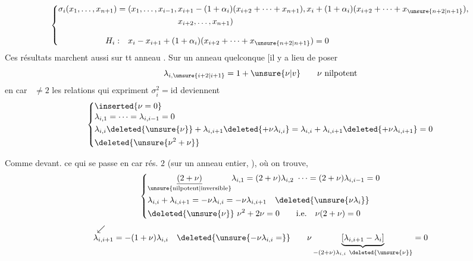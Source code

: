 \deleted{$\unsure{\sigma}$}
\[
\left\{\begin{aligned}
\sigma_i(x_1,\ldots,x_{n+1})={}&(x_1,\ldots,x_{i-1},x_{i+1}-(1+\alpha_i)(x_{i+2}+\cdots+x_{n+1}),x_i+(1+\alpha_i)(x_{i+2}+\cdots+x_{\unsure{n+2|n+1}}),\\
&\hspace{6em}x_{i+2},\ldots,x_{n+1})\\[2ex]
H_i:\quad &x_i-x_{i+1}+(1+\alpha_i)(x_{i+2}+\cdots+x_{\unsure{n+2|n+1}})=0
\end{aligned}\right.
\]
Ces résultats marchent aussi sur tt anneau . Sur un anneau quelconque [il y a lieu de  poser
\[
\lambda_{i,\unsure{i+2|i+1}}=1+\unsure{\nu|v}\qquad \nu\ \text{nilpotent}
\]
 en car \ $\ne2$ les relations qui expriment $\sigma_i^2=\mathrm{id}$ deviennent \unsure{$\nu$}
\[
\left\{\begin{aligned}
&\inserted{\nu=0}\\[-.5ex]
&\lambda_{i,1}=\cdots=\lambda_{i,i-1}=0\\
&\lambda_{i,i}\deleted{\unsure{\nu}}+\lambda_{i,i+1}\deleted{+\nu\lambda_{i,i}}=\lambda_{i,i}+\lambda_{i,i+1}\deleted{+\nu\lambda_{i,i+1}}=0\\
&\deleted{\unsure{\nu^2+\nu}}
\end{aligned}\right.
\]

Comme devant.  ce qui se passe en car rés. $2$ (sur un anneau entier, ), où on trouve, 
\[
\left\{\begin{aligned}
&\underset{\text{\unsure{nilpotent|inversible}}}{\underline{(2+\nu)}}\lambda_{i,1}=(2+\nu)\lambda_{i,2}\ \cdots=(2+\nu)\lambda_{i,i-1}=0\\
&\lambda_{i,i}+\lambda_{i,i+1}=-\nu\lambda_{i,i}=-\nu\lambda_{i,i+1}\quad\deleted{\unsure{\nu\lambda_i}}\\
&\deleted{\unsure{\nu}}\ \nu^2+2\nu=0\qquad\text{i.e.}\quad\nu(2+\nu)=0
\end{aligned}\right.
\]
\[
\begin{aligned}
\swarrow\quad&\\[-1ex]
\lambda_{i,i+1}&=-(1+\nu)\lambda_{i,i}\quad\deleted{\unsure{-\nu\lambda_{i,i}=}}\qquad
\nu\underbrace{[\lambda_{i,i+1}-\lambda_i]}_{-(2+\nu)\lambda_{i,i}\ \deleted{\unsure{\nu}}}=0
\end{aligned}
\]
